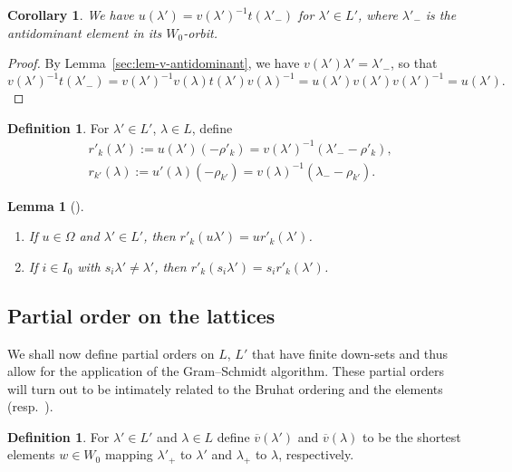 \documentclass[pdftex]{sigma}
\newtheorem{Lemma}[Theorem]{Lemma}
\newtheorem{Corollary}[Theorem]{Corollary}
\theoremstyle{definition}
\newtheorem{Definition}[Theorem]{Definition}
\numberwithin{equation}{section}
\begin{document}
\begin{Corollary}
 We have $u(\lambda')=v(\lambda')^{-1}t(\lambda'_-)$ for $\lambda'\in L'$, where
 $\lambda'_-$ is the antidominant element in its $W_0$-orbit.
\end{Corollary}
\begin{proof}
 By Lemma~\ref{sec:lem-v-antidominant}, we have $v(\lambda')\lambda'=\lambda'_-$,
 so that
 \[
 v(\lambda')^{-1}t(\lambda'_-) = v(\lambda')^{-1}v(\lambda)t(\lambda')v(\lambda)^{-1}
 = u(\lambda')v(\lambda')v(\lambda')^{-1}
 = u(\lambda').\tag*{\qed}
 \]\renewcommand{\qed}{}
\end{proof}

\begin{Definition}
 For $\lambda'\in L'$, $\lambda\in L$, define
 \begin{align*}
& r'_k(\lambda'):= u(\lambda')(-\rho'_k)= v(\lambda')^{-1}(\lambda'_--\rho'_k),\\
& r_{k'}(\lambda):= u'(\lambda)(-\rho_{k'}) = v(\lambda)^{-1}(\lambda_--\rho_{k'}).
 \end{align*}
\end{Definition}

\begin{Lemma}[{\cite[Section~2.8.4]{macdonald}}] \label{sec:lem-pull-out-of-r}\leavevmode
\begin{enumerate}\itemsep=0pt
\item[$(i)$] If $u\in\Omega$ and $\lambda'\in L'$, then $r'_k(u\lambda')=ur'_k(\lambda')$.
\item[$(ii)$] If $i\in I_0$ with $s_i\lambda'\ne\lambda'$, then $r'_k(s_i\lambda')=s_ir'_k(\lambda')$.
\end{enumerate}
\end{Lemma}

\subsection{Partial order on the lattices}\label{sec:partial-order}
We shall now define partial orders on $L$, $L'$ that have finite
down-sets and thus allow for the application of the Gram--Schmidt algorithm.
These
partial orders will turn out to be intimately related to the Bruhat
ordering and the elements  (resp.\
).

\begin{Definition}
 For $\lambda'\in L'$ and $\lambda\in L$ define $\overline{v}(\lambda')$ and
 $\overline{v}(\lambda)$ to be the shortest elements $w\in W_0$ mapping
 $\lambda'_+$ to $\lambda'$ and $\lambda_+$ to $\lambda$, respectively.
\end{Definition}
\end{document}
